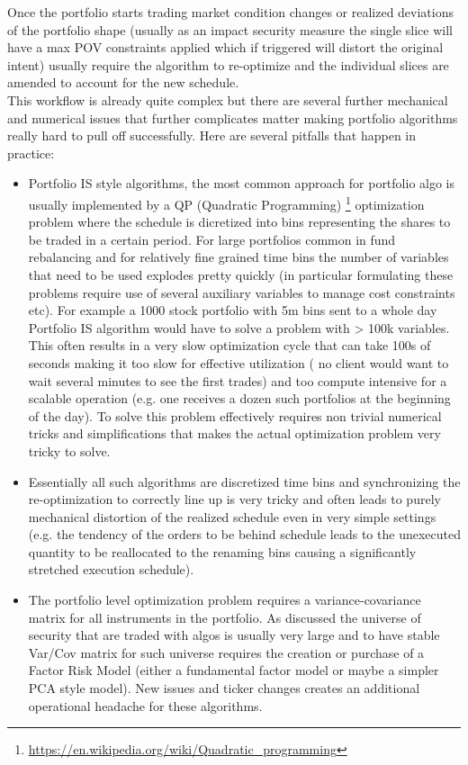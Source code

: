Once the portfolio starts trading market condition changes or realized deviations of the portfolio shape (usually as an impact security measure the single slice will have a max POV constraints applied which if triggered will distort the original intent) usually require the algorithm to re-optimize and the individual slices are amended to account for the new schedule.\\

This workflow is already quite complex but there are several further mechanical and numerical issues that further complicates matter making portfolio algorithms really hard to pull off successfully. Here are several pitfalls that happen in practice:
\begin{itemize}
\item Portfolio IS style algorithms, the most common approach for portfolio algo is usually implemented by a QP (Quadratic Programming) \footnote{\url{https://en.wikipedia.org/wiki/Quadratic_programming}} optimization problem where the schedule is dicretized into bins representing the shares to be traded in a certain period. For large portfolios common in fund rebalancing and for relatively fine grained time bins  the number of variables that need to be used explodes pretty quickly (in particular formulating these problems require use of several auxiliary variables to manage cost constraints etc). For example a 1000 stock portfolio with 5m bins  sent to a whole day Portfolio IS algorithm would have to solve a problem with > 100k variables. This often results in a very slow  optimization cycle that can take 100s of seconds making it too slow  for effective utilization ( no client would want to wait several minutes to see the first trades) and too compute intensive for a scalable operation (e.g. one receives a dozen such portfolios at the beginning of the day). To solve this problem effectively requires non trivial numerical tricks and simplifications that makes the actual optimization problem very tricky to solve.
\item Essentially all such algorithms are discretized time bins and synchronizing the re-optimization to correctly line up is very tricky and often leads to purely mechanical distortion of the realized schedule even in very simple settings (e.g. the tendency of the orders to be behind schedule leads to the unexecuted quantity to be reallocated to the renaming bins causing a significantly stretched execution schedule).
\item The portfolio level optimization problem requires a variance-covariance matrix for all instruments in the portfolio. As discussed the universe of security that are traded with algos is usually very large and to have stable Var/Cov matrix for such universe requires the creation or purchase of a Factor Risk Model (either a fundamental factor model or maybe a simpler PCA style model). New issues and ticker changes creates an additional operational headache for these algorithms.

\end{itemize}
